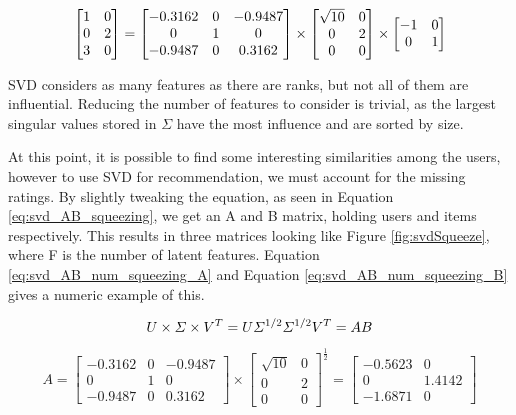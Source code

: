 \begin{equation}\label{eq:svd_num_decomp}
\centering
\begin{bmatrix}
1 & 0\\ 
0 & 2\\ 
3 & 0
\end{bmatrix} = 
\begin{bmatrix}
-0.3162 & 0 & -0.9487\\ 
0 & 1 & 0\\ 
-0.9487 & 0 & 0.3162
\end{bmatrix} \times 
\begin{bmatrix}
\sqrt{10} & 0\\ 
0 & 2\\ 
0 & 0
\end{bmatrix} \times
\begin{bmatrix}
-1 & 0\\ 
0 & 1
\end{bmatrix}
\end{equation}

SVD considers as many features as there are ranks, but not all of them are influential. Reducing the number of features to consider is trivial, as the largest singular values stored in $\Sigma$ have the most influence and are sorted by size.

At this point, it is possible to find some interesting similarities among the users, however to use SVD for recommendation, we must account for the missing ratings. By slightly tweaking the equation, as seen in Equation \ref{eq:svd_AB_squeezing}, we get an A and B matrix, holding users and items respectively. This results in three matrices looking like Figure \ref{fig:svdSqueeze}, where F is the number of latent features. Equation \ref{eq:svd_AB_num_squeezing_A} and Equation \ref{eq:svd_AB_num_squeezing_B} gives a numeric example of this.

\begin{equation}\label{eq:svd_AB_squeezing}
	\centering
	U\times \Sigma \times V^T = U\Sigma^{1/2} \Sigma^{1/2}V^T = AB
\end{equation}

\begin{equation}\label{eq:svd_AB_num_squeezing_A}
A = \begin{bmatrix}
-0.3162 & 0 & -0.9487\\ 
0 & 1 & 0\\ 
-0.9487 & 0 & 0.3162
\end{bmatrix} \times
\begin{bmatrix}
\sqrt{10} & 0\\ 
0 & 2\\ 
0 & 0
\end{bmatrix}^{\frac{1}{2}} =
\begin{bmatrix}
-0.5623 & 0\\ 
0 & 1.4142\\ 
-1.6871 & 0
\end{bmatrix}
\end{equation}

